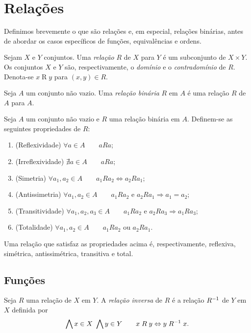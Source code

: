 \chapter{Relações}

Definimos brevemente o que são relações e, em especial, relações binárias, antes de abordar os casos específicos de funções, equivalências e ordens.

\begin{definition}
Sejam $X$ e $Y$ conjuntos. Uma \emph{relação} $R$ de $X$ para $Y$ é um subconjunto de $X \times Y$. Os conjuntos $X$ e $Y$ são, respectivamente, o \emph{domínio} e o \emph{contradomínio} de $R$. Denota-se $x \mathrel{R} y$ para $(x,y) \in R$.
\end{definition}

\begin{definition}
	Seja $A$ um conjunto não vazio. Uma \emph{relação binária} $R$ em $A$ é uma relação $R$ de $A$ para $A$.
\end{definition}

\begin{definition}
	Seja $A$ um conjunto não vazio e $R$ uma relação binária em $A$. Definem-se as seguintes propriedades de $R$:
	\begin{enumerate}
	\item (Reflexividade) $\forall a \in A \qquad aRa$;
	\item (Irreflexividade) $\nexists a \in A \qquad aRa$;
	\item (Simetria) $\forall a_1,a_2 \in A \qquad a_1Ra_2 \Leftrightarrow a_2Ra_1$;
	\item (Antissimetria) $\forall a_1,a_2 \in A \qquad a_1Ra_2 \text{\ \ e\ \ } a_2Ra_1 \Rightarrow a_1=a_2$;
	\item (Transitividade) $\forall a_1,a_2,a_3 \in A \qquad a_1Ra_2 \text{\ \ e\ \ } a_2Ra_3 \Rightarrow a_1Ra_3$;
	\item (Totalidade) $\forall a_1,a_2 \in A \qquad a_1Ra_2 \text{\ \ ou\ \ } a_2Ra_1$.
	\end{enumerate}
	Uma relação que satisfaz as propriedades acima é, respectivamente, reflexiva, simétrica, antissimétrica, transitiva e total.
\end{definition}

\section{Funções}

\begin{definition}
Seja $R$ uma relação de $X$ em $Y$. A \emph{relação inversa} de $R$ é a relação $R^{-1}$ de $Y$ em $X$ definida por
	\begin{equation*}
	\bigwedge\nolimits x \in X\ \bigwedge\nolimits y \in Y \qquad x \mathrel{R} y \Leftrightarrow y \mathrel{R^{-1}} x.
	\end{equation*}
\end{definition}


